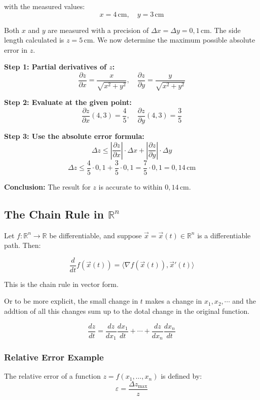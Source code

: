with the measured values:
\[
x = 4 \, \text{cm}, \quad y = 3 \, \text{cm}
\]

Both \( x \) and \( y \) are measured with a precision of \( \Delta x = \Delta y = 0{,}1 \, \text{cm} \). The side length calculated is \( z = 5 \, \text{cm} \). We now determine the maximum possible absolute error in \( z \).

\textbf{Step 1: Partial derivatives of \( z \):}
\[
\frac{\partial z}{\partial x} = \frac{x}{\sqrt{x^2 + y^2}}, \quad
\frac{\partial z}{\partial y} = \frac{y}{\sqrt{x^2 + y^2}}
\]

\textbf{Step 2: Evaluate at the given point:}
\[
\frac{\partial z}{\partial x}(4, 3) = \frac{4}{5}, \quad
\frac{\partial z}{\partial y}(4, 3) = \frac{3}{5}
\]

\textbf{Step 3: Use the absolute error formula:}
\[
\Delta z \leq \left| \frac{\partial z}{\partial x} \right| \cdot \Delta x + \left| \frac{\partial z}{\partial y} \right| \cdot \Delta y
\]
\[
\Delta z \leq \frac{4}{5} \cdot 0{,}1 + \frac{3}{5} \cdot 0{,}1 = \frac{7}{5} \cdot 0{,}1 = 0{,}14 \, \text{cm}
\]

\textbf{Conclusion:}  
The result for \( z \) is accurate to within \( \boxed{0{,}14 \, \text{cm}} \).


\subsection{The Chain Rule in \( \mathbb{R}^n \)}

Let \( f : \mathbb{R}^n \to \mathbb{R} \) be differentiable, and suppose \( \vec{x} = \vec{x}(t) \in \mathbb{R}^n \) is a differentiable path. Then:

\[
\frac{d}{dt} f(\vec{x}(t)) = \langle \nabla f(\vec{x}(t)), \vec{x}'(t) \rangle
\]

This is the chain rule in vector form.

Or to be more explicit, the small change in \(t\) makes a change in \(x_1, x_2, \cdots\) and the addtion of all this changes
sum up to the dotal change in the original function.

\[
\frac{dz}{dt} = \frac{dz}{dx_1}\frac{dx_1}{dt} + \cdots + \frac{dz}{dx_n}\frac{dx_n}{dt}
\]
\subsubsection*{Relative Error Example}

The relative error of a function \( z = f(x_1, \dots, x_n) \) is defined by:
\[
\varepsilon = \frac{\Delta z_{\max}}{z}
\]

